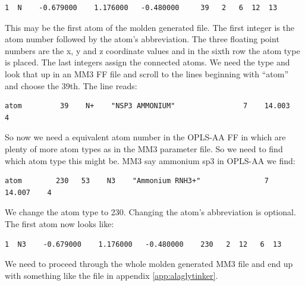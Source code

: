 \documentclass[a4paper,11pt]{scrartcl}
\begin{document}
\begin{lstlisting}[frame=single,]
  1  N    -0.679000    1.176000   -0.480000     39   2   6  12  13
\end{lstlisting}

This may be the first atom of the molden generated file. The first integer is the atom number followed by the atom's abbreviation. The three floating point numbers are the x, y and z coordinate values and in the sixth row the atom type is placed. The last integers assign the connected atoms. We need the type and look that up in an MM3 FF file and scroll to the lines beginning with ``atom'' and choose the 39th. The line reads:


\begin{lstlisting}[frame=single,]
atom         39    N+    "NSP3 AMMONIUM"                7    14.003    4
\end{lstlisting}

So now we need a equivalent atom number in the OPLS-AA FF in which are plenty of more atom types as in the MM3 parameter file. So we need to find which atom type this might be. MM3 say ammonium sp3 in OPLS-AA we find:

\begin{lstlisting}[frame=single,]
atom        230   53    N3    "Ammonium RNH3+"               7    14.007    4
\end{lstlisting}

We change the atom type to 230. Changing the atom's abbreviation is optional. The first atom now looks like:

\begin{lstlisting}[frame=single,]
  1  N3    -0.679000    1.176000   -0.480000    230   2  12   6  13
\end{lstlisting}

We need to proceed through the whole molden generated MM3 file and end up with something like the file in appendix \ref{app:alaglytinker}.
\end{document}
